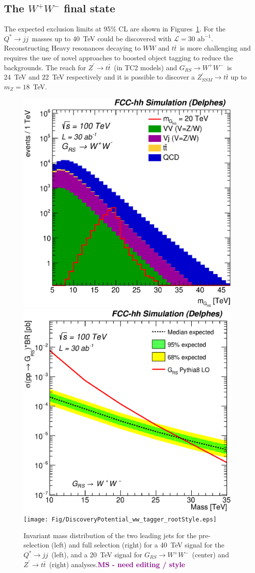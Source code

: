 \documentclass[a4paper,11pt]{article}
\newcommand{\MS}[1] {\textbf{\textcolor{purple}{MS - #1}}}
\newcommand*{\Zptt}{\ensuremath{Z^{\prime} \rightarrow \ttbar}}
\newcommand*{\intlumifcc}{\ensuremath{\mathcal{L}=30\text{ ab}^{-1}}}
\newcommand*{\qjj}{\ensuremath{Q^{*} \rightarrow jj}}
\newcommand*{\rsg}{\ensuremath{G_{RS} \rightarrow W^+W^-}}
\newcommand*{\ttbar}{\ensuremath{t\bar{t}}}
\newcommand*{\ww}{\ensuremath{W^{+}W^{-}}}
\begin{document}
\subsection{The \texorpdfstring{\ww}{ww} final state}
\label{sec:hadww}

The expected exclusion limits at 95\% CL are shown in Figures~\ref{figure:hadronicresonances:ww}. For the \qjj\ masses up to 40~TeV could be discovered with \intlumifcc. Reconstructing Heavy resonances decaying to $WW$ and \ttbar\ is more challenging and requires the use of novel approaches to boosted object tagging to reduce the backgrounds. The reach for \Zptt\ (in TC2 models) and \rsg\ is 24~TeV and 22~TeV respectively and it is possible to discover a $Z^{\prime}_{SSM} \rightarrow \ttbar$ up to $m_{Z}=18$~TeV.

\begin{figure}[!htb]
  \centering
  \includegraphics[width=0.32\columnwidth]{Fig/Mj1j2_pf08_fit_sel4_nostack_log.eps}
  \includegraphics[width=0.32\columnwidth]{Fig/lim_RSGraviton_ww_fcc_v02.eps}
  \texttt{[image: Fig/DiscoveryPotential\_ww\_tagger\_rootStyle.eps]}
  \caption{Invariant mass distribution of the two leading jets for the pre-selection (left) and full selection (right) for a 40~TeV signal for the \qjj\ (left), and a 20~TeV signal for \rsg\ (center) and \Zptt\ (right) analyses.\MS{need editing / style}}
  \label{figure:hadronicresonances:ww}
\end{figure}



\end{document}

